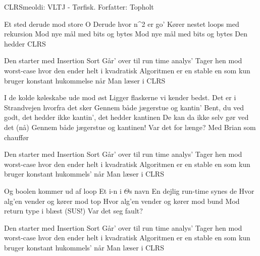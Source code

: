 \begin{sang}{CLRS}{meoldi: VLTJ - Tørfisk. Forfatter: Topholt}
\begin{vers}
Et sted derude mod store O
Derude hvor n^2 er go'
Kører nestet loops med rekursion
Mod nye mål med bits og bytes
Mod nye mål med bits og bytes
Den hedder CLRS
\end{vers}
\begin{omkvaed}
Den starter med Insertion Sort
Går' over til run time analys' 
Tager hen mod worst-case hvor den ender helt i kvadratisk
Algoritmen er en stable en som kun bruger konstant hukommelse når
Man læser i CLRS
\end{omkvaed}
\begin{vers}
I de kolde køleskabe ude mod øst
Ligger flaskerne vi kender bedst.
Det er i Strandvejen hvorfra det sker
Gennem både jægerstue og kantin'
Bent, du ved godt, det hedder ikke kantin', det hedder kantinen
De kan da ikke selv gør ved det (nå)
Gennem både jægerstue og kantinen!
Var det for længe?
Med Brian som chauffør
\end{vers}
\begin{omkvaed}
Den starter med Insertion Sort
Går' over til run time analys' 
Tager hen mod worst-case hvor den ender helt i kvadratisk
Algoritmen er en stable en som kun bruger konstant hukommels' når
Man læser i CLRS
\end{omkvaed}
\begin{vers}
Og boolen kommer ud af loop
Et i-n i $\Theta$s navn
En dejlig run-time synes de
Hvor alg'en vender og kører mod top
Hvor alg'en vender og kører mod bund
Mod return type i blæst (SUS!)
Var det seg fault?
\end{vers}
\begin{omkvaed}
Den starter med Insertion Sort
Går' over til run time analys' 
Tager hen mod worst-case hvor den ender helt i kvadratisk
Algoritmen er en stable en som kun bruger konstant hukommels' når
Man læser i CLRS
\end{omkvaed}
\end{sang}